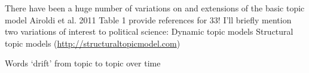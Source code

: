 \documentclass{mediumfoils}
\begin{document}
%

%
%
%
%
%
%
%
%
%
%
%
%
%
%
%
%
%






There have been a huge number of variations on and extensions of the basic topic model 
\ita
\itm Airoldi et al. 2011 Table 1 provide references for 33!
\itz
I'll briefly mention two variations of interest to political science:
\ita
\itm Dynamic topic models
\itm Structural topic models (\url{http://structuraltopicmodel.com})
\itz


Words `drift' from topic to topic over time
\end{document}
